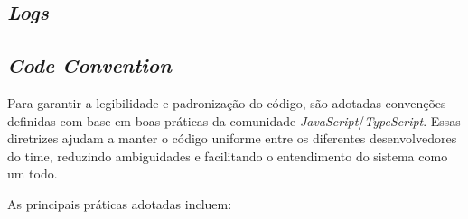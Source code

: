 \subsection{\textit{Logs}}

\subsection{\textit{Code Convention}}
Para garantir a legibilidade e padronização do código, são adotadas convenções definidas com base em boas práticas da comunidade \textit{JavaScript}/\textit{TypeScript}.
Essas diretrizes ajudam a manter o código uniforme entre os diferentes desenvolvedores do time, reduzindo ambiguidades e facilitando o entendimento do sistema como um todo.

As principais práticas adotadas incluem:


